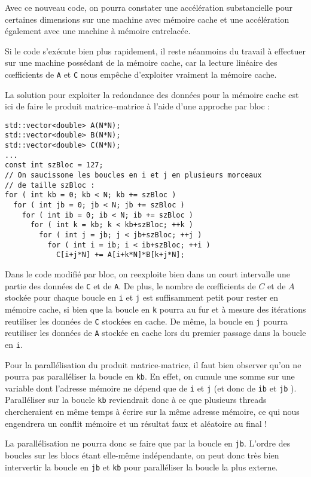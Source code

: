\documentclass[fleqn,11pt]{article}
\begin{document}
Avec ce nouveau code, on pourra constater une accélération substancielle pour certaines dimensions sur une machine avec mémoire cache et une accélération également avec une machine à mémoire entrelacée.

Si le code s'exécute bien plus rapidement, il reste néanmoins du travail à effectuer sur une machine possédant de la mémoire cache, car la lecture linéaire des c{\oe}fficients de \texttt{A} et \texttt{C} nous empêche d'exploiter vraiment la mémoire cache.

La solution pour exploiter la redondance des données pour la mémoire cache est ici de faire le produit matrice--matrice à l'aide d'une approche par bloc :

\begin{lstlisting}
std::vector<double> A(N*N);
std::vector<double> B(N*N);
std::vector<double> C(N*N);
...
const int szBloc = 127;
// On saucissone les boucles en i et j en plusieurs morceaux 
// de taille szBloc :
for ( int kb = 0; kb < N; kb += szBloc )
  for ( int jb = 0; jb < N; jb += szBloc )
    for ( int ib = 0; ib < N; ib += szBloc )
      for ( int k = kb; k < kb+szBloc; ++k )
        for ( int j = jb; j < jb+szBloc; ++j )
          for ( int i = ib; i < ib+szBloc; ++i )
            C[i+j*N] += A[i+k*N]*B[k+j*N];
\end{lstlisting}

Dans le code modifié par bloc, on reexploite bien dans un court intervalle une partie des données
de \texttt{C} et de \texttt{A}. De plus, le nombre de c{\oe}fficients de $C$ et de $A$ stockée pour chaque
boucle en \texttt{i} et \texttt{j} est suffisamment petit pour rester en mémoire cache, si bien que la boucle
en \texttt{k} pourra au fur et à mesure des itérations reutiliser les données de \texttt{C} stockées en cache.
De même, la boucle en \texttt{j} pourra reutiliser les données de \texttt{A} stockée en cache lors du premier passage dans la boucle en \texttt{i}.

Pour la parallélisation du produit matrice-matrice, il faut bien observer qu'on ne pourra pas paralléliser
la boucle en \texttt{kb}. En effet, on cumule une somme sur une variable dont l'adresse mémoire ne dépend
que de \texttt{i} et \texttt{j} (et donc de \texttt{ib} et \texttt{jb} ). Paralléliser sur la boucle 
\texttt{kb} reviendrait donc à ce que plusieurs threads chercheraient en même temps à écrire sur la
même adresse mémoire, ce qui nous engendrera un conflit mémoire et un résultat faux et aléatoire au final !

La parallélisation ne pourra donc se faire que par la boucle en \texttt{jb}. L'ordre des boucles sur les blocs étant elle-même indépendante, on peut donc très bien intervertir la boucle en \texttt{jb} et \texttt{kb} pour paralléliser la boucle la plus externe.
\end{document}
